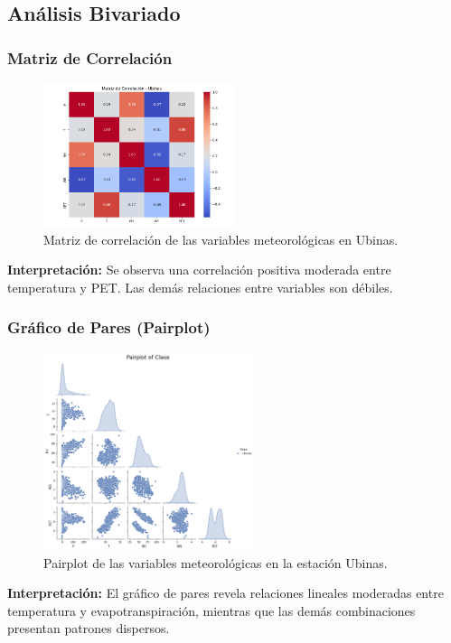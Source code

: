 \subsection{Análisis Bivariado}

\subsubsection*{Matriz de Correlación}
\begin{figure}[H]
\centering
\includegraphics[width=0.5\textwidth]{resultados/por_estacion_meteorologica/Ubinas/matriz_correlacion.png}
\caption{Matriz de correlación de las variables meteorológicas en Ubinas.}
\label{fig:ubinas_corr}
\end{figure}
\textbf{Interpretación:} Se observa una correlación positiva moderada entre temperatura y PET. Las demás relaciones entre variables son débiles.

\subsubsection*{Gráfico de Pares (Pairplot)}
\begin{figure}[H]
\centering
\includegraphics[width=0.55\textwidth]{resultados/por_estacion_meteorologica/Ubinas/pairplot.png}
\caption{Pairplot de las variables meteorológicas en la estación Ubinas.}
\label{fig:ubinas_pairplot}
\end{figure}
\textbf{Interpretación:} El gráfico de pares revela relaciones lineales moderadas entre temperatura y evapotranspiración, mientras que las demás combinaciones presentan patrones dispersos.


